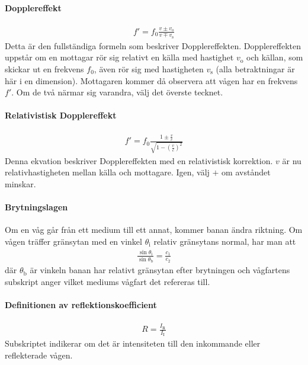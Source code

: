 \paragraph{Dopplereffekt}
\begin{align*}
	f' = f_0\frac{v\pm v_{\text{o}}}{v\mp v_{\text{s}}}
\end{align*}
Detta är den fullständiga formeln som beskriver Dopplereffekten. Dopplereffekten uppstår om en mottagar rör sig relativt en källa med hastighet $v_{\text{o}}$ och källan, som skickar ut en frekvens $f_0$, även rör sig med hastigheten $v_{\text{s}}$ (alla betraktningar är här i en dimension). Mottagaren kommer då observera att vågen har en frekvens $f'$. Om de två närmar sig varandra, välj det överste tecknet.

\deriv

\paragraph{Relativistisk Dopplereffekt}
\begin{align*}
	f' = f_0\frac{1\pm\frac{v}{c}}{\sqrt{1 - \left(\frac{v}{c}\right)^2}}
\end{align*}
Denna ekvation beskriver Dopplereffekten med en relativistisk korrektion. $v$ är nu relativhastigheten mellan källa och mottagare. Igen, välj $+$ om avståndet minskar.

\paragraph{Brytningslagen}
Om en våg går från ett medium till ett annat, kommer banan ändra riktning. Om vågen träffer gränsytan med en vinkel $\theta_{\text{i}}$ relativ gränsytans normal, har man att
\begin{align*}
	\frac{\sin{\theta_{\text{i}}}}{\sin{\theta_{\text{b}}}} = \frac{c_{1}}{c_{2}}
\end{align*}
där $\theta_{\text{b}}$ är vinkeln banan har relativt gränsytan efter brytningen och vågfartens subskript anger vilket mediums vågfart det refereras till.

\deriv

\paragraph{Definitionen av reflektionskoefficient}
\begin{align*}
	R = \frac{I_\text{R}}{I_\text{I}}
\end{align*}
Subskriptet indikerar om det är intensiteten till den inkommande eller reflekterade vågen.

